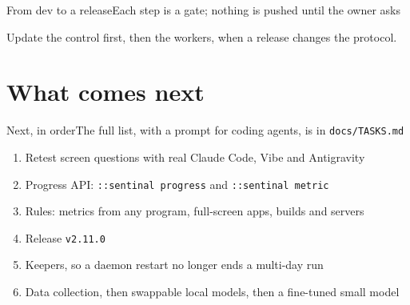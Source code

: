 \documentclass[aspectratio=169,11pt]{beamer}
\begin{document}
\begin{frame}{From dev to a release}{Each step is a gate; nothing is pushed until the owner asks}
\vspace{6mm}
\vfill
{\small{}Update the control first, then the workers, when a release changes the protocol.}
\end{frame}

\section{What comes next}

\begin{frame}{Next, in order}{The full list, with a prompt for coding agents, is in \texttt{docs/TASKS.md}}
\begin{enumerate}
  \item Retest screen questions with real Claude Code, Vibe and Antigravity
  \item Progress API: \texttt{::sentinal progress} and \texttt{::sentinal metric}
  \item Rules: metrics from any program, full-screen apps, builds and servers
  \item Release \texttt{v2.11.0}
  \item Keepers, so a daemon restart no longer ends a multi-day run
  \item Data collection, then swappable local models, then a fine-tuned small model
\end{enumerate}
\end{frame}
\end{document}
